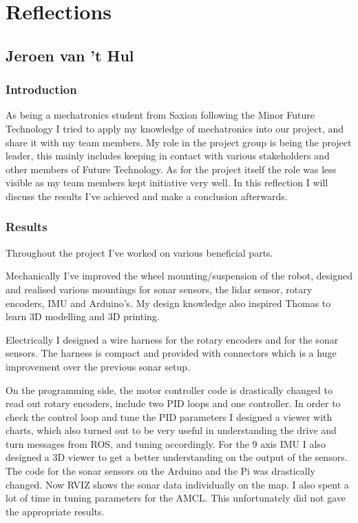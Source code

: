 \section{Reflections}

\subsection{Jeroen van 't Hul}

\subsubsection{Introduction}
As being a mechatronics student from Saxion following the Minor Future Technology I tried to apply my knowledge of mechatronics into our project, and share it with my team members. 
My role in the project group is being the project leader, this mainly includes keeping in contact with various stakeholders and other members of Future Technology. 
As for the project itself the role was less visible as my team members kept initiative very well. 
In this reflection I will discuss the results I've achieved and make a conclusion afterwards.


\subsubsection{Results}
Throughout the project I've worked on various beneficial parts. 

Mechanically I've improved the wheel mounting/suspension of the robot, designed and realised various mountings for sonar sensors, the lidar sensor, rotary encoders, IMU and Arduino's. My design knowledge also inspired Thomas to learn 3D modelling and 3D printing.

Electrically I designed a wire harness for the rotary encoders and for the sonar sensors. 
The harness is compact and provided with connectors which is a huge improvement over the previous sonar setup.

On the programming side, the motor controller code is drastically changed to read out rotary encoders, include two PID loops and one controller. 
In order to check the control loop and tune the PID parameters I designed a viewer with charts, which also turned out to be very useful in understanding the drive and turn messages from ROS, and tuning accordingly.
For the 9 axis IMU I also designed a 3D viewer to get a better understanding on the output of the sensors.
The code for the sonar sensors on the Arduino and the Pi was drastically changed. Now RVIZ shows the sonar data individually on the map.
I also spent a lot of time in tuning parameters for the AMCL. This unfortunately did not gave the appropriate results. 

